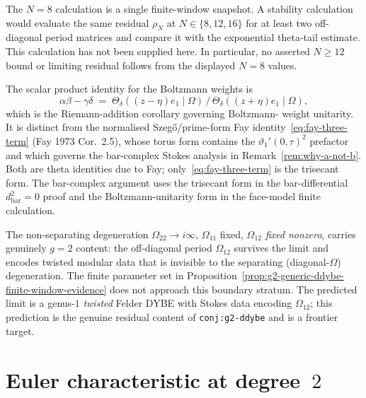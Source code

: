 \begin{remark}
\label{rem:tolerance-ladder-falsification}
The $N=8$ calculation is a single finite-window snapshot.  A stability
calculation would evaluate the same residual $\rho_N$ at
$N\in\{8,12,16\}$ for at least two off-diagonal period matrices and
compare it with the exponential theta-tail estimate.  This calculation
has not been supplied here.  In particular, no asserted
$N\geq12$ bound or limiting residual follows from the displayed
$N=8$ values.
\end{remark}

\begin{remark}
\label{rem:fay-versus-boltzmann-unitarity}
The scalar product identity for the Boltzmann weights is
\[
 \alpha\beta - \gamma\delta \;=\;
 \Theta_\delta((z-\eta)e_1\mid\Omega)\,/\,
 \Theta_\delta((z+\eta)e_1\mid\Omega),
\]
which is the Riemann-addition corollary governing Boltzmann-
weight unitarity. It is distinct from the normalised
Szeg\H{o}/prime-form Fay identity~\eqref{eq:fay-three-term}
(Fay 1973 Cor.~2.5), whose torus form contains the
$\vartheta_1'(0,\tau)^2$ prefactor and which governs the
bar-complex Stokes analysis in Remark~\ref{rem:why-a-not-b}.
Both are theta identities due to Fay; only~\eqref{eq:fay-three-term}
is the trisecant form. The bar-complex argument uses the
trisecant form in the bar-differential $d_{\mathrm{bar}}^2 = 0$
proof and the Boltzmann-unitarity form in the face-model
finite calculation.
\end{remark}

\begin{remark}
\label{rem:g2-nonseparating-untested}
The non-separating degeneration
$\Omega_{22}\to i\infty$, $\Omega_{11}$ fixed, $\Omega_{12}$
\emph{fixed nonzero}, carries genuinely $g=2$ content: the
off-diagonal period $\Omega_{12}$ survives the limit and
encodes twisted modular data that is invisible to the
separating (diagonal-$\Omega$) degeneration. The finite parameter
set in Proposition~\ref{prop:g2-generic-ddybe-finite-window-evidence}
does not approach this boundary stratum. The
predicted limit is a genus-$1$ \emph{twisted} Felder DYBE
with Stokes data encoding $\Omega_{12}$; this prediction is
the genuine residual content of
\texttt{conj:g2-ddybe} and is a frontier target.
\end{remark}

\section{Euler characteristic at degree~$2$}
\label{sec:g2-chi-minus-12}

